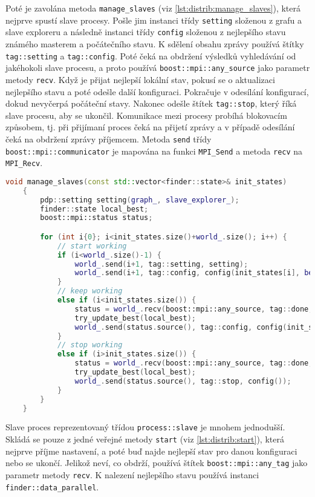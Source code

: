 Poté je zavolána metoda \texttt{manage\_slaves} (viz \ref{lst:distrib:manage_slaves}), která nejprve spustí slave procesy.
Pošle jim instanci třídy \texttt{setting} složenou z grafu a slave exploreru a následně instanci třídy \texttt{config} složenou z nejlepšího stavu známého masterem a počátečního stavu.
K sdělení obsahu zprávy používá štítky \texttt{tag::setting} a \texttt{tag::config}.
Poté čeká na obdržení výsledků vyhledávání od jakéhokoli slave procesu, a proto používá \texttt{boost::mpi::any\_source} jako parametr metody \texttt{recv}.
Když je přijat nejlepší lokální stav, pokusí se o aktualizaci nejlepšího stavu a poté odešle další konfiguraci.
Pokračuje v odesílání konfigurací, dokud nevyčerpá počáteční stavy.
Nakonec odešle štítek \texttt{tag::stop}, který říká slave procesu, aby se ukončil.
Komunikace mezi procesy probíhá blokovacím způsobem, tj. při přijímaní proces čeká na přijetí zprávy a v případě odesílání čeká na obdržení zprávy příjemcem.
Metoda \texttt{send} třídy \texttt{boost::mpi::communicator} je mapována na funkci \texttt{MPI\_Send} a metoda \texttt{recv} na \texttt{MPI\_Recv}.

\begin{lstlisting}[language=C++, label={lst:distrib:manage_slaves}, title={Metoda pro obstarání slave procesů}]
    void manage_slaves(const std::vector<finder::state>& init_states)
    {
        pdp::setting setting(graph_, slave_explorer_);
        finder::state local_best;
        boost::mpi::status status;

        for (int i{0}; i<init_states.size()+world_.size(); i++) {
            // start working
            if (i<world_.size()-1) {
                world_.send(i+1, tag::setting, setting);
                world_.send(i+1, tag::config, config(init_states[i], best_));
            }
            // keep working
            else if (i<init_states.size()) {
                status = world_.recv(boost::mpi::any_source, tag::done, local_best);
                try_update_best(local_best);
                world_.send(status.source(), tag::config, config(init_states[i], best_));
            }
            // stop working
            else if (i>init_states.size()) {
                status = world_.recv(boost::mpi::any_source, tag::done, local_best);
                try_update_best(local_best);
                world_.send(status.source(), tag::stop, config());
            }
        }
    }
\end{lstlisting}

Slave proces reprezentovaný třídou \texttt{process::slave} je mnohem jednodušší.
Skládá se pouze z jedné veřejné metody \texttt{start} (viz \ref{lst:distrib:start}), která nejprve příjme nastavení, a poté buď najde nejlepší stav pro danou konfiguraci nebo se ukončí.
Jelikož neví, co obdrží, používá štítek \texttt{boost::mpi::any\_tag} jako parametr metody \texttt{recv}.
K nalezení nejlepšího stavu používá instanci \texttt{finder::data\_parallel}.

